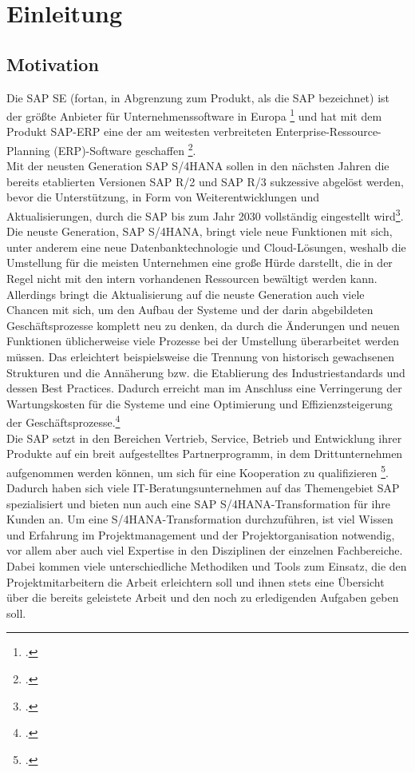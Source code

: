 \section{Einleitung}
\subsection{Motivation}
Die SAP SE (fortan, in Abgrenzung zum Produkt, als \glqq{}die\grqq{} SAP bezeichnet) ist der größte Anbieter für Unternehmenssoftware in Europa \footcite{sap-about} und hat mit dem Produkt SAP-ERP eine der am weitesten verbreiteten Enterprise-Ressource-Planning (ERP)-Software geschaffen \footcite{}. \\Mit der neusten Generation SAP S/4HANA sollen in den nächsten Jahren die bereits etablierten Versionen SAP R/2 und SAP R/3 sukzessive abgelöst werden, bevor die Unterstützung, in Form von Weiterentwicklungen und Aktualisierungen, durch die SAP bis zum Jahr 2030 vollständig eingestellt wird\footcite{sap-support}. Die neuste Generation, SAP S/4HANA, bringt viele neue Funktionen mit sich, unter anderem eine neue Datenbanktechnologie und Cloud-Lösungen, weshalb die Umstellung für die meisten Unternehmen eine große Hürde darstellt, die in der Regel nicht mit den intern vorhandenen Ressourcen bewältigt werden kann. Allerdings bringt die Aktualisierung auf die neuste Generation auch viele Chancen mit sich, um den Aufbau der Systeme und der darin abgebildeten Geschäftsprozesse komplett neu zu denken, da durch die Änderungen und neuen Funktionen üblicherweise viele Prozesse bei der Umstellung überarbeitet werden müssen. Das erleichtert beispielsweise die Trennung von historisch gewachsenen Strukturen und die Annäherung bzw. die Etablierung des Industriestandards und dessen Best Practices. Dadurch erreicht man im Anschluss eine Verringerung der Wartungskosten für die Systeme und eine Optimierung und Effizienzsteigerung der Geschäftsprozesse.\footcite{}\\ 
Die SAP setzt in den Bereichen Vertrieb, Service, Betrieb und  Entwicklung ihrer Produkte auf ein breit aufgestelltes Partnerprogramm, in dem Drittunternehmen aufgenommen werden können, um sich für eine Kooperation zu qualifizieren \footcite{sap-partner}. Dadurch haben sich viele IT-Beratungsunternehmen auf das Themengebiet SAP spezialisiert und bieten nun auch eine SAP S/4HANA-Transformation für ihre Kunden an. Um eine S/4HANA-Transformation durchzuführen, ist viel Wissen und Erfahrung im Projektmanagement und der Projektorganisation notwendig, vor allem aber auch viel Expertise in den Disziplinen der einzelnen Fachbereiche. Dabei kommen viele unterschiedliche Methodiken und Tools zum Einsatz, die den Projektmitarbeitern die Arbeit erleichtern soll und ihnen stets eine Übersicht über die bereits geleistete Arbeit und den noch zu erledigenden Aufgaben geben soll. 

